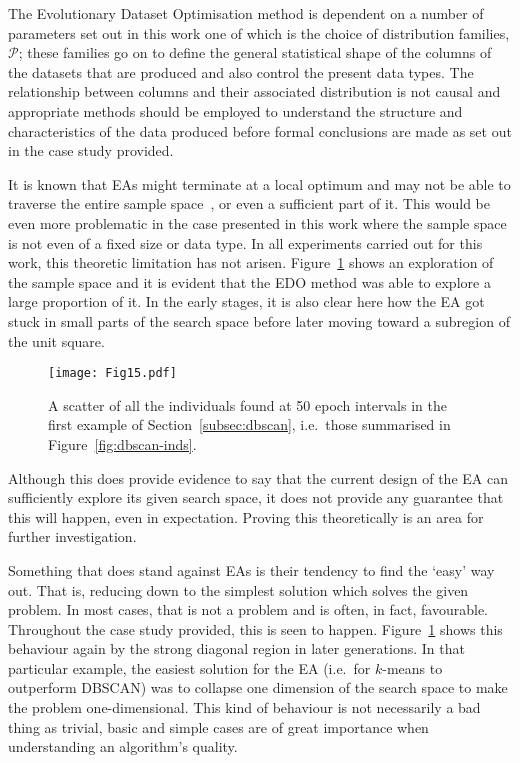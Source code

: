 The Evolutionary Dataset Optimisation method is dependent on a number of
parameters set out in this work one of which is the choice of distribution
families, \(\mathcal{P}\); these families go on to define the general
statistical shape of the columns of the datasets that are produced and also
control the present data types. The relationship between columns and their
associated distribution is not causal and appropriate methods should be employed
to understand the structure and characteristics of the data produced before
formal conclusions are made as set out in the case study provided.

It is known that EAs might terminate at a local optimum and may not be able to
traverse the entire sample space~\cite{Vikhar2016}, or even a sufficient part of
it. This would be even more problematic in the case presented in this work where
the sample space is not even of a fixed size or data type. In all experiments
carried out for this work, this theoretic limitation has not arisen.
Figure~\ref{fig:coverage} shows an exploration of the sample space and it is
evident that the EDO method was able to explore a large proportion of it. In the
early stages, it is also clear here how the EA got stuck in small parts of the
search space before later moving toward a subregion of the unit square.

\begin{figure}[htbp]
    \texttt{[image: Fig15.pdf]}
    \caption{%
        A scatter of all the individuals found at 50 epoch intervals in the
        first example of Section~\ref{subsec:dbscan}, i.e.\ those summarised in
        Figure~\ref{fig:dbscan-inds}.
    }\label{fig:coverage}
\end{figure}

Although this does provide evidence to say that the current design of the EA can
sufficiently explore its given search space, it does not provide any guarantee
that this will happen, even in expectation. Proving this theoretically is an
area for further investigation.

Something that does stand against EAs is their tendency to find the `easy' way
out. That is, reducing down to the simplest solution which solves the given
problem. In most cases, that is not a problem and is often, in fact, favourable.
Throughout the case study provided, this is seen to happen.
Figure~\ref{fig:coverage} shows this behaviour again by the strong diagonal
region in later generations. In that particular example, the easiest solution
for the EA (i.e.\ for \(k\)-means to outperform DBSCAN) was to collapse one
dimension of the search space to make the problem one-dimensional. This kind of
behaviour is not necessarily a bad thing as trivial, basic and simple cases are
of great importance when understanding an algorithm's quality.

